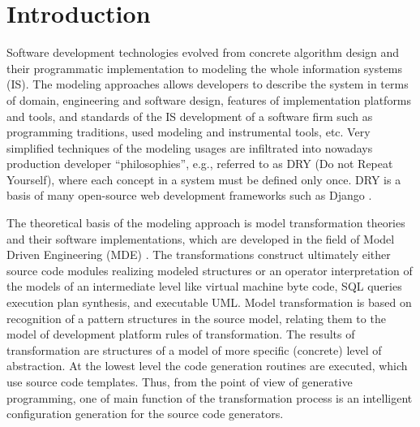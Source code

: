 \documentclass[conference]{IEEEtran}
\begin{document}
%
\IEEEpeerreviewmaketitle



\section{Introduction}
Software development technologies evolved from concrete algorithm design and their programmatic implementation to modeling the whole information systems (IS).  The modeling approaches allows developers to describe the system in terms of domain, engineering and software design, features of implementation platforms and tools, and standards of the IS development of a software firm such as programming traditions, used modeling and instrumental tools, etc.  Very simplified techniques of the modeling usages are infiltrated into nowadays production developer ``philosophies'', e.g., referred to as DRY (Do not Repeat Yourself), where each concept in a system must be defined only once.  DRY is a basis of many open-source web development frameworks such as Django \cite{django}.

The theoretical basis of the modeling approach is model transformation theories and their software implementations, which are developed in the field of Model Driven Engineering (MDE) \cite{dde}.  The transformations construct ultimately either source code modules realizing modeled structures or an operator interpretation of the models of an intermediate level like virtual machine byte code, SQL queries execution plan synthesis, and executable UML.  Model transformation is based on recognition of a pattern structures in the source model, relating them to the model of development platform rules of transformation.  The results of transformation are  structures of a model of more specific (concrete) level of abstraction.  At the lowest level the code generation routines are executed, which use source code templates.  Thus, from the point of view of generative programming, one of main function of the transformation process is an intelligent configuration generation for the source code generators.
\end{document}
